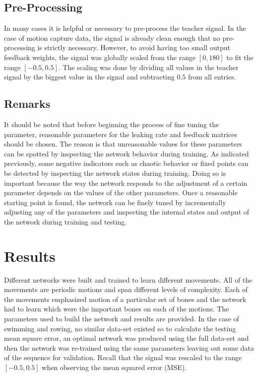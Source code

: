 \documentclass[letterpaper,9pt]{article}
\begin{document}


\subsection{Pre-Processing}

In many cases it is helpful or necessary to pre-process the teacher signal. In the case of motion capture data, the signal is already clean enough that no pre-processing is strictly necessary. However, to avoid having too small output feedback weights, the signal was globally scaled from the range $[0,180]$ to fit the range $[-0.5,0.5]$. The scaling was done by dividing all values in the teacher signal by the biggest value in the signal and subtracting $0.5$ from all entries.  

\subsection{Remarks}

It should be noted that before beginning the process of fine tuning the parameter, reasonable parameters for the leaking rate and feedback matrices should be chosen. The reason is that unreasonable values for these parameters can be spotted by inspecting the network behavior during training. As indicated previously, some negative indicators such as chaotic behavior or fixed points can be detected by inspecting the network states during training. Doing so is important because the way the network responds to the adjustment of a certain parameter depends on the values of the other parameters. Once a reasonable starting point is found, the network can be finely tuned by incrementally adjusting any of the parameters and inspecting the internal states and output of the network during training and testing.

\section{Results}

Different networks were built and trained to learn different movements. All of the movements are periodic motions and span different levels of complexity. Each of the movements emphasized motion of a particular set of bones and the network had to learn which were the important bones on each of the motions. The parameters used to build the network and results are provided. In the case of swimming and rowing, no similar data-set existed so to calculate the testing mean square error, an optimal network was produced using the full data-set and then the network was re-trained using the same parameters leaving out some data of the sequence for validation. Recall that the signal was rescaled to the range $[-0.5,0.5]$ when observing the mean squared error (MSE).
\end{document}
